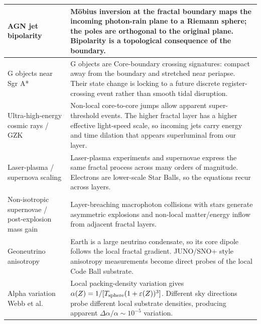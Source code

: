 \documentclass[11pt,a4paper]{article}
\begin{document}
\begin{center}
\begin{longtable}{|L{4.25cm}|L{9.85cm}|}
\hline
AGN jet bipolarity & M\"obius inversion at the fractal boundary maps the incoming photon-rain plane to a Riemann sphere; the poles are orthogonal to the original plane. Bipolarity is a topological consequence of the boundary. \\
\hline
G objects near Sgr A* & G objects are Core-boundary crossing signatures: compact away from the boundary and stretched near periapse. Their state change is locking to a future discrete register-crossing event rather than smooth tidal disruption. \\
\hline
Ultra-high-energy cosmic rays / GZK & Non-local core-to-core jumps allow apparent super-threshold events. The higher fractal layer has a higher effective light-speed scale, so incoming jets carry energy and time dilation that appears superluminal from our layer. \\
\hline
Laser-plasma / supernova scaling & Laser-plasma experiments and supernovae express the same fractal process across many orders of magnitude. Electrons are lower-scale Star Balls, so the equations recur across layers. \\
\hline
Non-isotropic supernovae / post-explosion mass gain & Layer-breaching macrophoton collisions with stars generate asymmetric explosions and non-local matter/energy inflow from adjacent fractal layers. \\
\hline
Geoneutrino anisotropy & Earth is a large neutrino condensate, so its core dipole follows the local fractal gradient. JUNO/SNO+ style anisotropy measurements become direct probes of the local Code Ball substrate. \\
\hline
Alpha variation Webb et al. & Local packing-density variation gives \(\alpha(Z)=1/[T_{\rm sphere}(1+\varepsilon(Z))^3]\). Different sky directions probe different local substrate densities, producing apparent \(\Delta\alpha/\alpha\sim10^{-5}\) variation. \\
\hline


\end{longtable}
\end{center}
\end{document}

